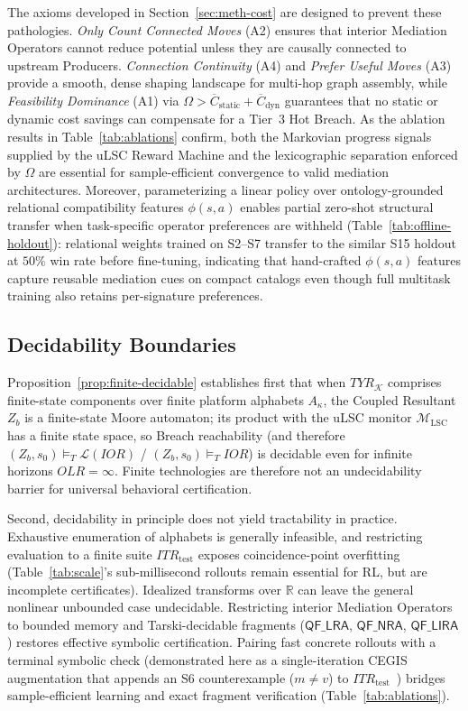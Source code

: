 The axioms developed in Section~\ref{sec:meth-cost} are designed to prevent these pathologies.  \emph{Only Count Connected Moves} (A2) ensures that interior Mediation Operators cannot reduce potential unless they are causally connected to upstream Producers.  \emph{Connection Continuity} (A4) and \emph{Prefer Useful Moves} (A3) provide a smooth, dense shaping landscape for multi-hop graph assembly, while \emph{Feasibility Dominance} (A1) via $\Omega > \overline{C}_{\text{static}} + \overline{C}_{\text{dyn}}$ guarantees that no static or dynamic cost savings can compensate for a Tier~3 Hot Breach.  As the ablation results in Table~\ref{tab:ablations} confirm, both the Markovian progress signals supplied by the uLSC Reward Machine and the lexicographic separation enforced by $\Omega$ are essential for sample-efficient convergence to valid mediation architectures.  Moreover, parameterizing a linear policy over ontology-grounded relational compatibility features $\phi(s, a)$ enables partial zero-shot structural transfer when task-specific operator preferences are withheld (Table~\ref{tab:offline-holdout}): relational weights trained on S2--S7 transfer to the similar S15 holdout at $50\%$ win rate before fine-tuning, indicating that hand-crafted $\phi(s, a)$ features capture reusable mediation cues on compact catalogs even though full multitask training also retains per-signature preferences.

\subsection{Decidability Boundaries} \label{sec:disc-decidability}

Proposition~\ref{prop:finite-decidable} establishes first that when $TYR_{\mathcal{K}}$ comprises finite-state components over finite platform alphabets $A_{\kappa}$, the Coupled Resultant $Z_b$ is a finite-state Moore automaton; its product with the uLSC monitor $\mathcal{M}_{\text{LSC}}$ has a finite state space, so Breach reachability (and therefore $(Z_b, s_0) \models_T \mathcal{L}(IOR)$ / $(Z_b, s_0) \models_T IOR$) is decidable even for infinite horizons $OLR = \infty$.  Finite technologies are therefore not an undecidability barrier for universal behavioral certification.

Second, decidability in principle does not yield tractability in practice.  Exhaustive enumeration of alphabets is generally infeasible, and restricting evaluation to a finite suite $ITR_{\text{test}}$ exposes coincidence-point overfitting (Table~\ref{tab:scale}'s sub-millisecond rollouts remain essential for RL, but are incomplete certificates).  Idealized transforms over $\mathbb{R}$ can leave the general nonlinear unbounded case undecidable.  Restricting interior Mediation Operators to bounded memory and Tarski-decidable fragments ($\mathsf{QF\_LRA}$, $\mathsf{QF\_NRA}$, $\mathsf{QF\_LIRA}$) restores effective symbolic certification.  Pairing fast concrete rollouts with a terminal symbolic check (demonstrated here as a single-iteration CEGIS augmentation that appends an S6 counterexample ($m \neq v$) to $ITR_{\text{test}}$~\cite{SolarLezama2008Sketch, AlurEtAl2013SyGuS}) bridges sample-efficient learning and exact fragment verification (Table~\ref{tab:ablations}).

